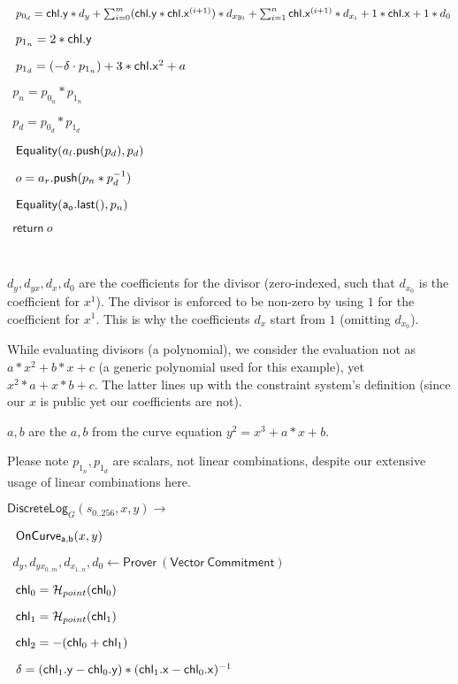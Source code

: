 \documentclass[]{article}
\begin{document}
$~~p_{0_d} = \mathsf{chl}\mathsf{.y} * d_y + \sum^m_{i=0} (\mathsf{chl}\mathsf{.y} * \mathsf{chl}\mathsf{.x}^{(i+1)}) * d_{xy_{i}} + \sum^n_{i=1} \mathsf{chl}\mathsf{.x}^{(i+1)} * d_{x_{i}} + 1 * \mathsf{chl}\mathsf{.x} + 1 * d_0$

$~~p_{1_n} = 2 * \mathsf{chl}\mathsf{.y}$

$~~p_{1_d} = (-\delta \cdot p_{1_n}) + 3 * \mathsf{chl}\mathsf{.x}^2 + a$

$~~p_n = p_{0_n} * p_{1_n}$

$~~p_d = p_{0_d} * p_{1_d}$

$~~\mathsf{Equality}(a_l\mathsf{.push}(p_d), p_d)$

$~~o = a_r\mathsf{.push}(p_n * p_d^{-1})$

$~~\mathsf{Equality}(\mathsf{a_o.last()}, p_n)$

$~~\mathsf{return} ~o$

\

$d_y, d_{yx}, d_x, d_0$ are the coefficients for the divisor (zero-indexed, such that $d_{x_0}$ is the coefficient for $x^1$). The divisor is enforced to be non-zero by using $1$ for the coefficient for $x^1$. This is why the coefficients $d_x$ start from $1$ (omitting $d_{x_0}$).

While evaluating divisors (a polynomial), we consider the evaluation not as $a * x^2 + b * x + c$ (a generic polynomial used for this example), yet $x^2 * a + x * b + c$. The latter lines up with the constraint system's definition (since our $x$ is public yet our coefficients are not).

$a, b$ are the $a, b$ from the curve equation $y^2 = x^3 + a * x + b$.

Please note $p_{1_n}, p_{1_d}$ are scalars, not linear combinations, despite our extensive usage of linear combinations here.

\pagebreak

\newcommand{\circuitin}{\leftarrow \mathsf{Prover ~(Vector ~Commitment)}}

\newcommand{\dlog}{\mathsf{DiscreteLog}}

$\dlog_G(s_{0..256}, x, y) \rightarrow$

$~~\mathsf{OnCurve_{a,b}}(x, y)$

$~~d_y, d_{yx_{0..m}}, d_{x_{1..n}}, d_0 \circuitin$

$~~\mathsf{chl}_0 = \mathcal{H}_{point}(\mathsf{chl}_0)$

$~~\mathsf{chl}_1 = \mathcal{H}_{point}(\mathsf{chl}_1)$

$~~\mathsf{chl}_2 = -(\mathsf{chl}_0 + \mathsf{chl}_1)$

$~~\delta = (\mathsf{chl}_1\mathsf{.y} - \mathsf{chl}_0\mathsf{.y}) * (\mathsf{chl}_1\mathsf{.x} - \mathsf{chl}_0\mathsf{.x})^{-1}$
\end{document}
